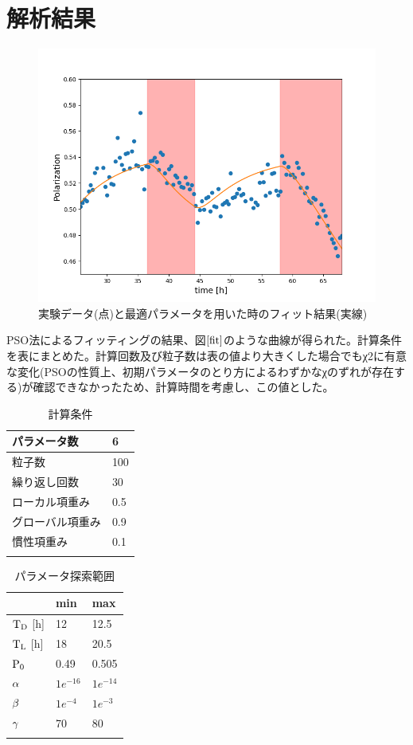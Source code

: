 \section{解析結果}
\begin{figure}[h]
  \centering
  \includegraphics[width= 13cm]{./chap3/fig/fit.png}
  \caption{実験データ(点)と最適パラメータを用いた時のフィット結果(実線)}
  \label{fit}
\end{figure}
PSO法によるフィッティングの結果、図$\ref{fit}$のような曲線が得られた。計算条件を表にまとめた。計算回数及び粒子数は表の値より大きくした場合でもχ2に有意な変化(PSOの性質上、初期パラメータのとり方によるわずかなχのずれが存在する)が確認できなかったため、計算時間を考慮し、この値とした。
\begin{table}[]
  \begin{tabular}{|l|l|}
  \hline
  パラメータ数   & 6   \\ \hline
  粒子数      & 100 \\ \hline
  繰り返し回数   & 30  \\ \hline
  ローカル項重み  & 0.5 \\ \hline
  グローバル項重み & 0.9 \\ \hline
  慣性項重み    & 0.1 \\ \hline
  \caption{計算条件}
  \end{tabular}
  \end{table}

\begin{table}[]
  \begin{tabular}{|l|l|l|}
  \hline
               & min   & max   \\ \hline
  $\rm{T_D}$ {[}h{]} & 12    & 12.5  \\ \hline
  $\rm{T_L}$ {[}h{]} & 18    & 20.5  \\ \hline
  $\rm{P_0}$         & 0.49  & 0.505 \\ \hline
  $\rm{\alpha}$        & $1e^{-16}$ & $1e^{-14}$ \\ \hline
  $\rm{\beta}$         & $1e^{-4}$  & $1e^{-3}$  \\ \hline
  $\rm{\gamma}$        & 70    & 80    \\ \hline
  \caption{パラメータ探索範囲}
  \end{tabular}
  \end{table}

